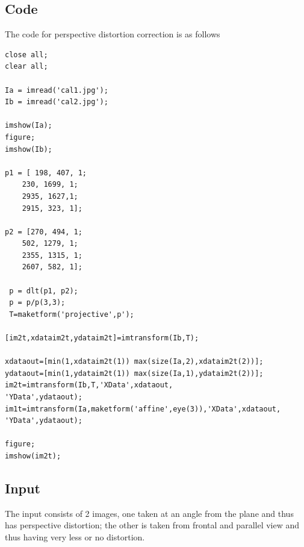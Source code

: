 \documentclass[12pt]{article}
\begin{document}
\subsection{Code}
The code for perspective distortion correction is as follows
\begin{lstlisting}
close all;
clear all;

Ia = imread('cal1.jpg');
Ib = imread('cal2.jpg');

imshow(Ia);
figure;
imshow(Ib);

p1 = [ 198, 407, 1;
    230, 1699, 1;
    2935, 1627,1;
    2915, 323, 1];

p2 = [270, 494, 1;
    502, 1279, 1;
    2355, 1315, 1;
    2607, 582, 1];
    
 p = dlt(p1, p2);
 p = p/p(3,3);
 T=maketform('projective',p');

[im2t,xdataim2t,ydataim2t]=imtransform(Ib,T);

xdataout=[min(1,xdataim2t(1)) max(size(Ia,2),xdataim2t(2))];
ydataout=[min(1,ydataim2t(1)) max(size(Ia,1),ydataim2t(2))];
im2t=imtransform(Ib,T,'XData',xdataout,
'YData',ydataout);
im1t=imtransform(Ia,maketform('affine',eye(3)),'XData',xdataout,
'YData',ydataout);

figure;
imshow(im2t);

\end{lstlisting}

\subsection{Input}
The input consists of 2 images, one taken at an angle from the plane and thus has perspective distortion; the other is taken from frontal and parallel view and thus having very less or no distortion. 
\end{document}
